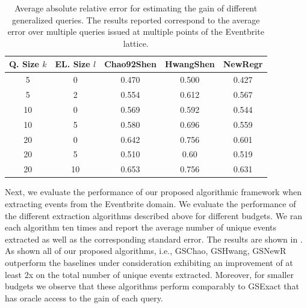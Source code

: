 \begin{table}
\small\center
\caption{Average absolute relative error for estimating the gain of different generalized queries. The results reported correspond to the average error over multiple queries issued at multiple points of the Eventbrite lattice.}
\label{tab:eventesterror}
\begin{tabular}{|c|c|c|c|c|}
\hline
\textbf{Q. Size $k$} & \textbf{EL. Size $l$} & \textbf{Chao92Shen} & \textbf{HwangShen} & \textbf{NewRegr} \\ \hline
5 & 0 & 0.470 & 0.500 & 0.427 \\
5 & 2 & 0.554 & 0.612 & 0.567\\
10 & 0 & 0.569 & 0.592 & 0.544\\
10 & 5 & 0.580 & 0.696 & 0.559\\
20 & 0 & 0.642 & 0.756 &0.601\\
20 & 5 & 0.510 & 0.60 & 0.519 \\
20 & 10 & 0.653 & 0.756 & 0.631\\
\hline
\end{tabular}
\vspace{-10pt}
\end{table}


Next, we evaluate the performance of our proposed algorithmic framework when extracting events from the Eventbrite domain. We evaluate the performance of the different extraction algorithms described above for different budgets. We ran each algorithm ten times and report the average number of unique events extracted as well as the corresponding standard error. The results are shown in . As shown all of our proposed algorithms, i.e., GSChao, GSHwang, GSNewR outperform the baselines under consideration exhibiting an improvement of at least 2x on the total number of unique events extracted. Moreover, for smaller budgets we observe that these algorithms perform comparably to GSExact that has oracle access to the gain of each query.

